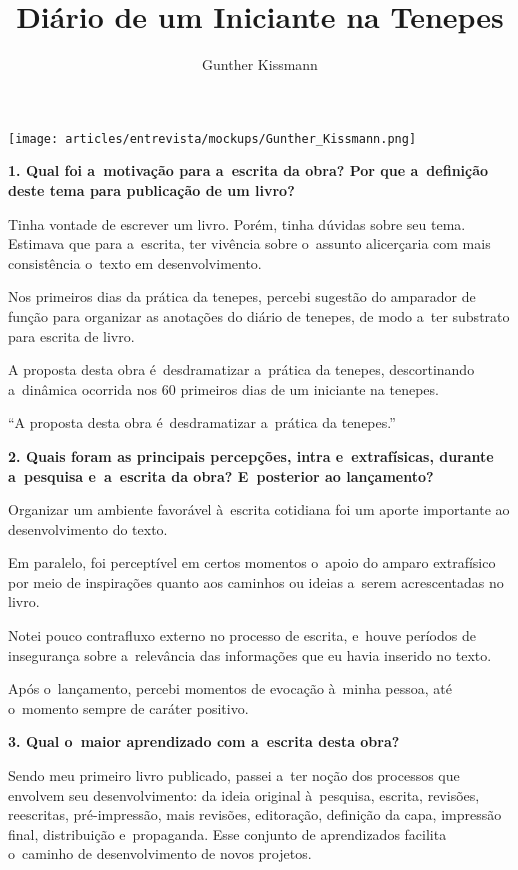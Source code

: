 \documentclass{gescons}
\author{Gunther Kissmann}
\title{Diário de um Iniciante na Tenepes}
\begin{document}
    \makeentrevistatitle

    \begin{multicols}{2}

\begin{center}
    \texttt{[image: articles/entrevista/mockups/Gunther\_Kissmann.png]}
\end{center}


\textbf{1. Qual foi a~motivação para a~escrita da obra? Por que a~definição deste tema para publicação de um livro?}

Tinha vontade de escrever um livro. Porém, tinha dúvidas sobre seu tema. Estimava que para a~escrita, ter vivência sobre o~assunto alicerçaria com mais consistência o~texto em desenvolvimento.

Nos primeiros dias da prática da tenepes, percebi sugestão do amparador de função para organizar as anotações do diário de tenepes, de modo a~ter substrato para escrita de livro.

A proposta desta obra é~desdramatizar a~prática da tenepes, descortinando a~dinâmica ocorrida nos 60 primeiros dias de um iniciante na tenepes.

\begin{pullquote}
``A proposta desta obra é~desdramatizar a~prática da tenepes.''
\end{pullquote}

\textbf{2. Quais foram as principais percepções, intra e~extrafísicas, durante a~pesquisa e~a~escrita da obra? E~posterior ao lançamento?}

Organizar um ambiente favorável à~escrita cotidiana foi um aporte importante ao desenvolvimento do texto.

Em paralelo, foi perceptível em certos momentos o~apoio do amparo extrafísico por meio de inspirações quanto aos caminhos ou ideias a~serem acrescentadas no livro.

Notei pouco contrafluxo externo no processo de escrita, e~houve períodos de insegurança sobre a~relevância das informações que eu havia inserido no texto.

Após o~lançamento, percebi momentos de evocação à~minha pessoa, até o~momento sempre de caráter positivo.

\textbf{3. Qual o~maior aprendizado com a~escrita desta obra?}

Sendo meu primeiro livro publicado, passei a~ter noção dos processos que envolvem seu desenvolvimento: da ideia original à~pesquisa, escrita, revisões, reescritas, pré-impressão, mais revisões, editoração, definição da capa, impressão final, distribuição e~propaganda. Esse conjunto de aprendizados facilita o~caminho de desenvolvimento de novos projetos.


\end{multicols}
\end{document}
